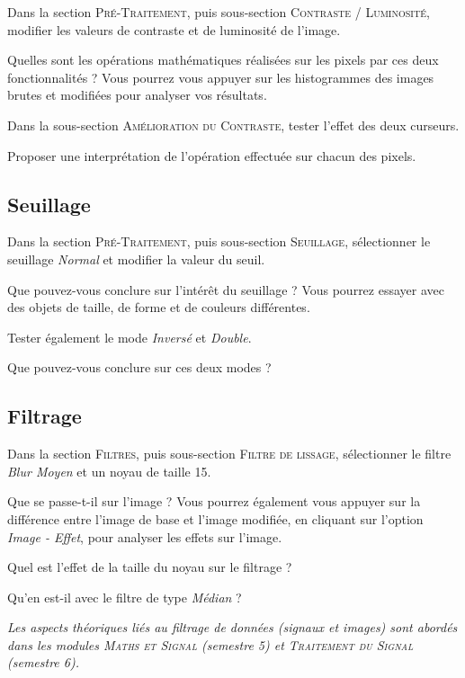 \documentclass[a4paper,11pt,titlepage]{article} %
\begin{document}
\Manip Dans la section \textsc{Pré-Traitement}, puis sous-section \textsc{Contraste / Luminosité}, modifier les valeurs de contraste et de luminosité de l'image.

\Quest Quelles sont les opérations mathématiques réalisées sur les pixels par ces deux fonctionnalités ? Vous pourrez vous appuyer sur les histogrammes des images brutes et modifiées pour analyser vos résultats.

\Manip Dans la sous-section \textsc{Amélioration du Contraste}, tester l'effet des deux curseurs.

\Quest Proposer une interprétation de l'opération effectuée sur chacun des pixels.


\subsection{Seuillage}

\Manip Dans la section \textsc{Pré-Traitement}, puis sous-section \textsc{Seuillage}, sélectionner le seuillage \textsl{Normal} et modifier la valeur du seuil.

\Quest Que pouvez-vous conclure sur l'intérêt du seuillage ? Vous pourrez essayer avec des objets de taille, de forme et de couleurs différentes.

\Manip Tester également le mode \textsl{Inversé} et \textsl{Double}.

\Quest Que pouvez-vous conclure sur ces deux modes ?
 

\subsection{Filtrage}

\Manip Dans la section \textsc{Filtres}, puis sous-section \textsc{Filtre de lissage}, sélectionner le filtre \textsl{Blur Moyen} et un noyau de taille 15.

\Quest Que se passe-t-il sur l'image ? Vous pourrez également vous appuyer sur la différence entre l'image de base et l'image modifiée, en cliquant sur l'option \textsl{Image - Effet}, pour analyser les effets sur l'image.

\Quest Quel est l'effet de la taille du noyau sur le filtrage ?

\Quest Qu'en est-il avec le filtre de type \textsl{Médian} ? 

\medskip

\textit{Les aspects théoriques liés au filtrage de données (signaux et images) sont abordés dans les modules \textsc{Maths et Signal} (semestre 5) et \textsc{Traitement du Signal} (semestre 6).}
\end{document}
